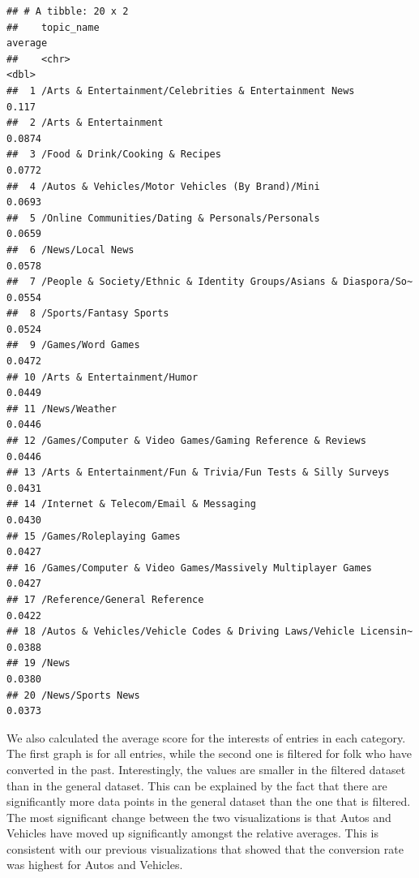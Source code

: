 \documentclass[]{article}
\begin{document}
\begin{verbatim}
## # A tibble: 20 x 2
##    topic_name                                                       average
##    <chr>                                                              <dbl>
##  1 /Arts & Entertainment/Celebrities & Entertainment News            0.117 
##  2 /Arts & Entertainment                                             0.0874
##  3 /Food & Drink/Cooking & Recipes                                   0.0772
##  4 /Autos & Vehicles/Motor Vehicles (By Brand)/Mini                  0.0693
##  5 /Online Communities/Dating & Personals/Personals                  0.0659
##  6 /News/Local News                                                  0.0578
##  7 /People & Society/Ethnic & Identity Groups/Asians & Diaspora/So~  0.0554
##  8 /Sports/Fantasy Sports                                            0.0524
##  9 /Games/Word Games                                                 0.0472
## 10 /Arts & Entertainment/Humor                                       0.0449
## 11 /News/Weather                                                     0.0446
## 12 /Games/Computer & Video Games/Gaming Reference & Reviews          0.0446
## 13 /Arts & Entertainment/Fun & Trivia/Fun Tests & Silly Surveys      0.0431
## 14 /Internet & Telecom/Email & Messaging                             0.0430
## 15 /Games/Roleplaying Games                                          0.0427
## 16 /Games/Computer & Video Games/Massively Multiplayer Games         0.0427
## 17 /Reference/General Reference                                      0.0422
## 18 /Autos & Vehicles/Vehicle Codes & Driving Laws/Vehicle Licensin~  0.0388
## 19 /News                                                             0.0380
## 20 /News/Sports News                                                 0.0373
\end{verbatim}

We also calculated the average score for the interests of entries in
each category. The first graph is for all entries, while the second one
is filtered for folk who have converted in the past. Interestingly, the
values are smaller in the filtered dataset than in the general dataset.
This can be explained by the fact that there are significantly more data
points in the general dataset than the one that is filtered. The most
significant change between the two visualizations is that Autos and
Vehicles have moved up significantly amongst the relative averages. This
is consistent with our previous visualizations that showed that the
conversion rate was highest for Autos and Vehicles.
\end{document}
